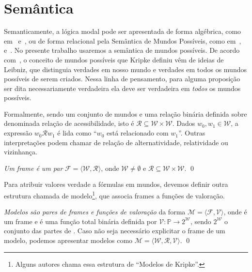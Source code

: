     \section{Semântica}
        \label{sec:LM-Semantica}
        Semanticamente, a lógica modal pode ser apresentada de forma algébrica, como em~ e~, ou
        de forma relacional pela Semântica de Mundos Possíveis, como em~,~ e~.
        No presente trabalho usaremos a semântica de mundos possíveis. De acordo com~, o conceito de mundos possíveis que Kripke
        definiu vêm de ideias de Leibniz, que distinguia verdades em nosso mundo e verdades em todos os mundos possíveis de serem criados. Nessa linha de pensamento,
        para alguma proposição ser dita necessariamente verdadeira ela deve ser verdadeira em \textit{todos} os mundos possíveis. %

        Formalmente, sendo  um conjunto de mundos e  uma relação binária definida sobre  denominada relação de acessibilidade,
        isto é \(\mathcal{R} \subseteq \mathcal{W} \times \mathcal{W}\). Dados \(w_0, w_1 \in \mathcal{W}\),
        a expressão \(w_0 \mathcal{R} w_1\) é lida como ``\(w_0\) está relacionado com \(w_1\)''. Outras interpretações podem chamar 
        de relação de alternatividade, relatividade ou vizinhança. %

        \begin{definicao}[Frames]
            \textit{Um frame é um par} \(\mathcal{F} = \langle \mathcal{W}, \mathcal{R} \rangle\), onde \(\mathcal{W} \neq \emptyset\) e
            \(\mathcal{R} \subseteq \mathcal{W} \times \mathcal{W}\). \qed
        \end{definicao}

        Para atribuir valores verdade a fórmulas em mundos, devemos definir outra estrutura chamada de modelo\footnote{Alguns autores
        chama essa estrutura de ``Modelos de Kripke''.}, que associa frames a funções de valoração.

        \sloppy
        \begin{definicao}[Modelos]
            \textit{Modelos são pares de frames e funções de valoração} da forma
            \({\mathcal{M} = \langle \mathcal{F}, \mathcal{V} \rangle}\), onde  é um frame e  é uma função total binária
            definida por \(\mathcal{V}: \mathbb{P} \to 2^{\mathcal{W}}\), sendo \(2^{\mathcal{W}}\) o conjunto
            das partes de . Caso não seja necessário explicitar o frame de um modelo, podemos apresentar modelos como
            \(\mathcal{M} = \langle \mathcal{W}, \mathcal{R}, \mathcal{V} \rangle\). \qed
        \end{definicao}

